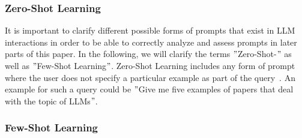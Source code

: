 \subsubsection{Zero-Shot Learning}
It is important to clarify different possible forms of prompts that exist in LLM interactions in order
to be able to correctly analyze and assess prompts in later parts of this paper.
In the following, we will clarify the terms \("\)Zero-Shot-\("\) as well as \("\)Few-Shot Learning\("\).
Zero-Shot Learning includes any form of prompt where the user does not specify a particular example as
part of the query~\cite[p. 1]{dang_how_2022}.
An example for such a query could be \("\)Give me five examples of papers that deal with the topic
of LLMs\("\).

\subsubsection{Few-Shot Learning}
